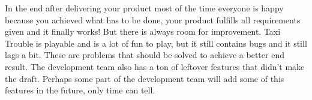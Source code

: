In the end after delivering your product most of the time everyone is happy because you achieved what has to be
done, your product fulfills all requirements given and it finally works! But there is always room for improvement.
Taxi Trouble is playable and is a lot of fun to play, but it still contains bugs and it still lags a bit. These are
problems that should be solved to achieve a better end result. The development team also has a ton of leftover
features that didn't make the draft. Perhaps some part of the development team will add some of this features
in the future, only time can tell.
